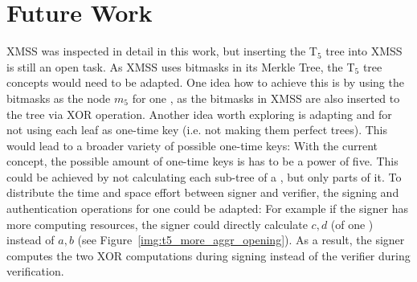 \section{Future Work}
XMSS was inspected in detail in this work, but inserting the T$_5$ tree into XMSS is still an open task. As XMSS uses bitmasks in its Merkle Tree, the T$_5$ tree concepts would need to be adapted. One idea how to achieve this is by using the bitmasks as the node $m_5$ for one \tftree, as the bitmasks in XMSS are also inserted to the tree via XOR operation.
Another idea worth exploring is adapting \tftree and \extree for not using each leaf as one-time key (i.e. not making them perfect trees). This would lead to a broader variety of possible one-time keys: With the current concept, the possible amount of one-time keys is has to be a power of five. This could be achieved by not calculating each sub-tree of a \tftree, but only parts of it.
To distribute the time and space effort between signer and verifier, the signing and authentication operations for one \tfblock could be adapted: 
For example if the signer has more computing resources, the signer could directly calculate $c,d$ (of one \tfblock) instead of $a,b$ (see Figure~\ref{img:t5_more_aggr_opening}). As a result, the signer computes the two XOR computations during signing instead of the verifier during verification.

